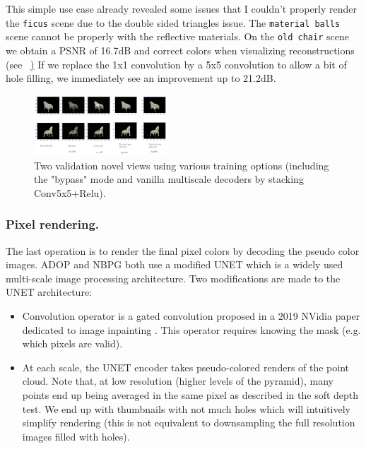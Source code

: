 This simple use case already revealed some issues that I couldn't properly render the \texttt{ficus} scene due to the double sided triangles issue. The \texttt{material balls} scene cannot be properly with the reflective materials.
On the \texttt{old chair} scene we obtain a PSNR of 16.7dB and correct colors when visualizing reconstructions (see ~\href{fig:results_vanilla}) If we replace the 1x1 convolution by a 5x5 convolution to allow a bit of hole filling, we immediately see an improvement up to 21.2dB.

\begin{figure}[H]
    \centering
    \includegraphics[width=0.45\textwidth]{figures/vanilla_architectures.png}
    \caption{Two validation novel views using various training options (including the "bypass" mode and vanilla multiscale decoders by stacking Conv5x5+Relu).}
    \label{fig:results_vanilla}
\end{figure}



\subsubsection{Pixel rendering.}
\label{sec:pixel rendering}
The last operation is to render the final pixel colors by decoding the pseudo color images.
ADOP \cite{ruckert2022adop} and NBPG \cite{Aliev2020} both use a modified UNET \cite{ronneberger2015unet} which is a widely used multi-scale image processing architecture. Two modifications are made to the UNET architecture:
\begin{itemize}
    \item Convolution operator is a gated convolution proposed in a 2019 NVidia paper dedicated to image inpainting \cite{yu2019freeform}. This operator requires knowing the mask (e.g. which pixels are valid).
    \item At each scale, the UNET encoder takes pseudo-colored renders of the point cloud. Note that, at low resolution (higher levels of the pyramid), many points end up being averaged in the same pixel as described in the soft depth test. We end up with thumbnails with not much holes which will intuitively simplify rendering (this is not equivalent to downsampling the full resolution images filled with holes). 
\end{itemize}

